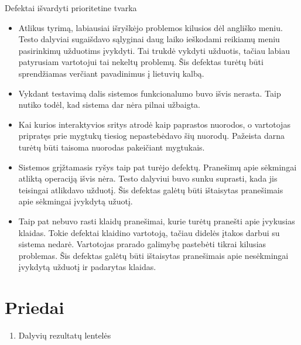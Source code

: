 	Defektai išvardyti prioritetine tvarka
	\begin{itemize}
		\item Atlikus tyrimą, labiausiai išryškėjo problemos kilusios dėl angliško meniu.
		Testo dalyviai sugaišdavo sąlyginai daug laiko ieškodami reikiamų meniu pasirinkimų užduotims įvykdyti.
		Tai trukdė vykdyti užduotis, tačiau labiau patyrusiam vartotojui tai nekeltų problemų.
		Šis defektas turėtų būti sprendžiamas verčiant pavadinimus į lietuvių kalbą.
		\item Vykdant testavimą dalis sistemos funkcionalumo buvo išvis nerasta.
		Taip nutiko todėl, kad sistema dar nėra pilnai užbaigta.
		\item Kai kurios interaktyvios sritys atrodė kaip paprastos nuorodos, o vartotojas pripratęs prie mygtukų tiesiog nepastebėdavo šių nuorodų.
		Pažeista darna turėtų būti taisoma nuorodas pakeičiant mygtukais.
		\item Sistemos grįžtamasis ryšys taip pat turėjo defektų.
		Pranešimų apie sėkmingai atliktą operaciją išvis nėra.
		Testo dalyviui buvo sunku suprasti, kada jis teisingai atlikdavo užduotį.
		Šis defektas galėtų būti ištaisytas pranešimais apie sėkmingai įvykdytą užuotį.
		\item Taip pat nebuvo rasti klaidų pranešimai, kurie turėtų pranešti apie įvykusias klaidas.
		Tokie defektai klaidino vartotoją, tačiau didelės įtakos darbui su sistema nedarė.
		Vartotojas prarado galimybę pastebėti tikrai kilusias problemas.
		Šis defektas galėtų būti ištaisytas pranešimais apie nesėkmingai įvykdytą užduotį ir padarytas klaidas.
	\end{itemize}

\section{Priedai}

	\begin{enumerate}
		\item Dalyvių rezultatų lentelės
	\end{enumerate}
